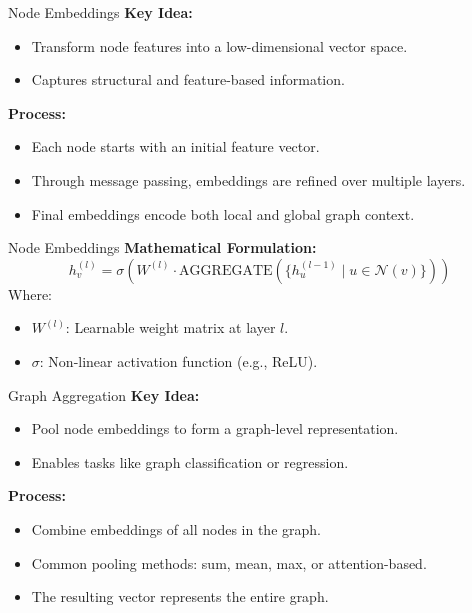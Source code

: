 \documentclass{beamer}
\begin{document}
\begin{frame}{Node Embeddings}
    \textbf{Key Idea:}
    \begin{itemize}
        \item Transform node features into a low-dimensional vector space.
        \item Captures structural and feature-based information.
    \end{itemize}
    
    \vspace{0.5cm}
    
    \textbf{Process:}
    \begin{itemize}
        \item Each node starts with an initial feature vector.
        \item Through message passing, embeddings are refined over multiple layers.
        \item Final embeddings encode both local and global graph context.
    \end{itemize}
\end{frame}
    
    
\begin{frame}{Node Embeddings}    
    \textbf{Mathematical Formulation:}
    \[
    h_v^{(l)} = \sigma\left(W^{(l)} \cdot \text{AGGREGATE}\left(\{h_u^{(l-1)} \mid u \in \mathcal{N}(v)\}\right)\right)
    \]
    Where:
    \begin{itemize}
        \item \( W^{(l)} \): Learnable weight matrix at layer \( l \).
        \item \( \sigma \): Non-linear activation function (e.g., ReLU).
    \end{itemize}
\end{frame}

\begin{frame}{Graph Aggregation}
    \textbf{Key Idea:}
    \begin{itemize}
        \item Pool node embeddings to form a graph-level representation.
        \item Enables tasks like graph classification or regression.
    \end{itemize}
    
    \textbf{Process:}
    \begin{itemize}
        \item Combine embeddings of all nodes in the graph.
        \item Common pooling methods: sum, mean, max, or attention-based.
        \item The resulting vector represents the entire graph.
    \end{itemize}
\end{frame}   
\end{document}
